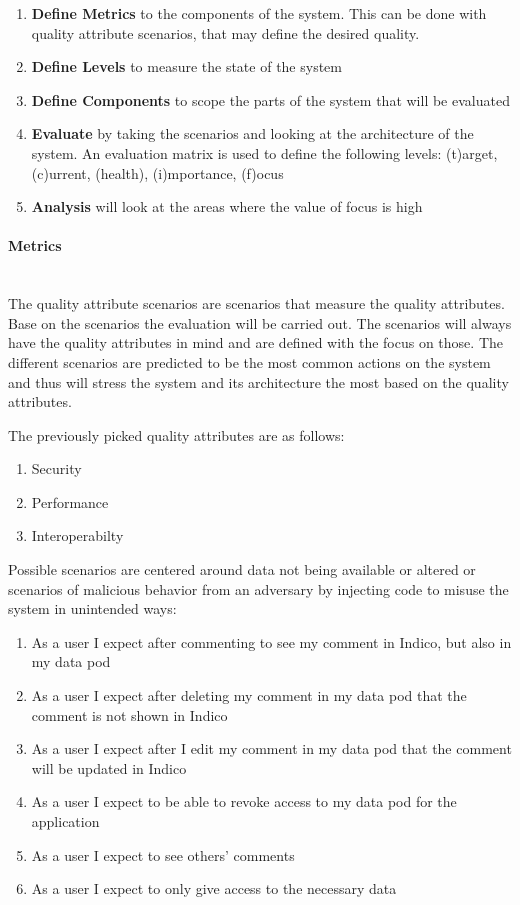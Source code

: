 \begin{enumerate}
    \item \textbf{Define Metrics} to the components of the system. This can be done with quality attribute scenarios, that may define the desired quality.
    \item \textbf{Define Levels} to measure the state of the system
    \item \textbf{Define Components} to scope the parts of the system that will be evaluated
    \item \textbf{Evaluate} by taking the scenarios and looking at the architecture of the system. An evaluation matrix is used to define the following levels: (t)arget, (c)urrent, (health), (i)mportance, (f)ocus
    \item \textbf{Analysis} will look at the areas where the value of focus is high
\end{enumerate}

\vspace{0.5cm}
\paragraph{Metrics}\mbox{}\\

The quality attribute scenarios are scenarios that measure the quality attributes. Base on the scenarios the evaluation will be carried out. The scenarios will always have the quality attributes in mind and are defined with the focus on those. The different scenarios are predicted to be the most common actions on the system and thus will stress the system and its architecture the most based on the quality attributes.

The previously picked quality attributes are as follows:

\begin{enumerate}
    \item Security
    \item Performance
    \item Interoperabilty
\end{enumerate}

Possible scenarios are centered around data not being available or altered or scenarios of malicious behavior from an adversary by injecting code to misuse the system in unintended ways:

\begin{enumerate}
    \item As a user I expect after commenting to see my comment in Indico, but also in my data pod
    \item As a user I expect after deleting my comment in my data pod that the comment is not shown in Indico
    \item As a user I expect after I edit my comment in my data pod that the comment will be updated in Indico
    \item As a user I expect to be able to revoke access to my data pod for the application
    \item As a user I expect to see others' comments
    \item As a user I expect to only give access to the necessary data
\end{enumerate}

